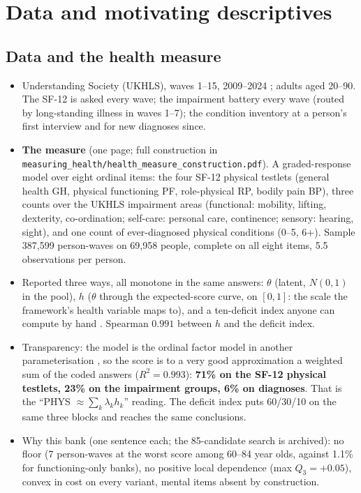 \documentclass[11pt]{article}
\newcommand{\code}[1]{\texttt{\small #1}}
\begin{document}
\section{Data and motivating descriptives}
\label{sec:data}

\subsection{Data and the health measure}

\begin{itemize}
\item Understanding Society (UKHLS), waves 1--15, 2009--2024 \citep{ukhls}; adults aged 20--90. The SF-12 is asked every wave; the impairment battery every wave (routed by long-standing illness in waves 1--7); the condition inventory at a person's first interview and for new diagnoses since.
\item \textbf{The measure} (one page; full construction in \code{measuring\_health/health\_measure\_construction.pdf}). A graded-response model \citep{samejima1969} over eight ordinal items: the four SF-12 physical testlets (general health GH, physical functioning PF, role-physical RP, bodily pain BP), three counts over the UKHLS impairment areas (functional: mobility, lifting, dexterity, co-ordination; self-care: personal care, continence; sensory: hearing, sight), and one count of ever-diagnosed physical conditions (0--5, 6+). Sample 387,599 person-waves on 69,958 people, complete on all eight items, 5.5 observations per person.
\item Reported three ways, all monotone in the same answers: $\theta$ (latent, $N(0,1)$ in the pool), $h$ ($\theta$ through the expected-score curve, on $[0,1]$: the scale the framework's health variable maps to), and a ten-deficit index anyone can compute by hand \citep{mitnitski2001,searle2008}. Spearman $0.991$ between $h$ and the deficit index.
\item Transparency: the model is the ordinal factor model in another parameterisation \citep{takane1987}, so the score is to a very good approximation a weighted sum of the coded answers ($R^2=0.993$): \textbf{71\% on the SF-12 physical testlets, 23\% on the impairment groups, 6\% on diagnoses}. That is the ``PHYS $\approx\sum_k\lambda_kh_k$'' reading. The deficit index puts 60/30/10 on the same three blocks and reaches the same conclusions.
\item Why this bank (one sentence each; the 85-candidate search is archived): no floor (7 person-waves at the worst score among 60--84 year olds, against 1.1\% for functioning-only banks), no positive local dependence (max $Q_3=+0.05$), convex in cost on every variant, mental items absent by construction.
\end{itemize}
\end{document}
